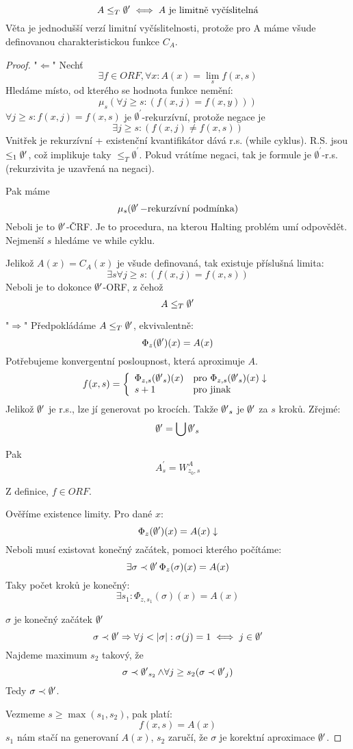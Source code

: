\begin{theorem}\label{lim_comp}
	\[ A \leq_T \operatorname{\emptyset^{\prime}} \iff A\ \text{je limitně vyčíslitelná} \]
	Věta je jednodušší verzí limitní vyčíslitelnosti, protože pro A máme všude definovanou charakteristickou funkce $C_A$.
\end{theorem}
\begin{proof}
	"$\Leftarrow$" Nechť
	\[ \exists f \in ORF, \forall x: A(x) = \lim_s f(x, s) \]
	Hledáme místo, od kterého se hodnota funkce nemění:
	\[ \mu_s(\forall j \geq s:(f(x, j) = f(x, y))) \]
	$\forall j \geq s: f(x, j) = f(x, s)$ je $\emptyset^{\prime}$-rekurzívní, protože negace je
	\[ \exists j \geq s:(f(x, j) \neq f(x, s)) \]
	Vnitřek je rekurzívní + existenční kvantifikátor dává r.s. (while cyklus).
	R.S. jsou $\leq_1 \operatorname{\emptyset^{\prime}}$, což implikuje taky $\leq_T \emptyset^{\prime}$.
	Pokud vrátíme negaci, tak je formule je $\emptyset^{\prime}$-r.s. (rekurzivita je uzavřená na negaci).

	Pak máme
	\[ \mu_s(\operatorname{\emptyset^{\prime}}-\text{rekurzívní podmínka}) \]
	Neboli je to $\operatorname{\emptyset^{\prime}}$-ČRF.
	Je to procedura, na kterou Halting problém umí odpovědět.
	Nejmenší $s$ hledáme ve while cyklu.

	Jelikož $A(x) = C_A(x)$ je všude definovaná, tak existuje příslušná limita:
	\[ \exists s \forall j \geq s:(f(x, j) = f(x, s)) \]
	Neboli je to dokonce $\operatorname{\emptyset^{\prime}}$-ORF, z čehož
	\[ A \leq_T \operatorname{\emptyset^{\prime}} \]

	"$\Rightarrow$" Předpokládáme $A \leq_T \operatorname{\emptyset^{\prime}}$, ekvivalentně:
	\[ \Phi_z(\operatorname{\emptyset^{\prime}})(x) = A(x) \]
	Potřebujeme konvergentní posloupnost, která aproximuje $A$.
	\[ f(x, s) = \left\{ \begin{array}{ll} \Phi_{z, s}(\operatorname{\emptyset^{\prime}}_s)(x) & \mbox{pro } \Phi_{z, s}(\operatorname{\emptyset^{\prime}}_s)(x) \downarrow \\ s + 1 & \mbox{pro } \text{jinak} \end{array} \right. \]
	Jelikož $\operatorname{\emptyset^{\prime}}$ je r.s., lze jí generovat po krocích.
	Takže $\operatorname{\emptyset^{\prime}}_s$ je $\operatorname{\emptyset^{\prime}}$ za $s$ kroků.
	Zřejmé:
	\[ \operatorname{\emptyset^{\prime}} = \bigcup \operatorname{\emptyset^{\prime}}_s \]

	Pak
	\[ A_s^{\prime} = W_{z_0, s}^A \]

	Z definice, $f \in ORF$.

	Ověříme existence limity.
	Pro dané $x$:
	\[ \Phi_{z}(\operatorname{\emptyset^{\prime}})(x) = A(x) \downarrow \]
	Neboli musí existovat konečný začátek, pomoci kterého počítáme:
	\[ \exists \sigma \prec \operatorname{\emptyset^{\prime}} \Phi_{z}(\sigma)(x) = A(x)\]
	Taky počet kroků je konečný:
	\[ \exists s_1: \Phi_{z, s_1}(\sigma)(x) = A(x) \]

	$\sigma$ je konečný začátek $\operatorname{\emptyset^{\prime}}$
	\[ \sigma \prec \operatorname{\emptyset^{\prime}} \Rightarrow \forall j < |\sigma|: \sigma(j) = 1 \iff j \in \operatorname{\emptyset^{\prime}} \]
	Najdeme maximum $s_2$ takový, že
	\[ \sigma \prec \operatorname{\emptyset^{\prime}}_{s_2} \land \forall j \geq s_2 (\sigma \prec \operatorname{\emptyset^{\prime}}_j) \]
	Tedy $\sigma \prec \operatorname{\emptyset^{\prime}}$.

	Vezmeme $s \geq \max(s_1, s_2)$, pak platí:
	\[ f(x, s) = A(x) \]
	$s_1$ nám stačí na generovaní $A(x)$, $s_2$ zaručí, že $\sigma$ je korektní aproximace $\operatorname{\emptyset^{\prime}}$.
\end{proof}

